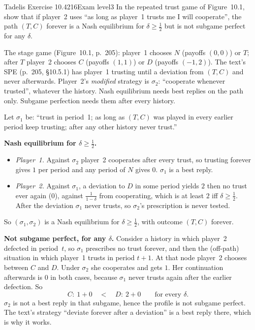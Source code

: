 \begin{exsol}{Tadelis Exercise 10.4}{216}{Exam level}{3}
\asked In the repeated trust game of Figure~10.1, show that if player~2 uses ``as long as player~1 trusts me I
will cooperate'', the path $(T, C)$ forever is a Nash equilibrium for $\delta \ge \frac12$ but is not
subgame perfect for any $\delta$.

\method The stage game (Figure~10.1, p.~205): player~1 chooses $N$ (payoffs $(0,0)$) or $T$; after $T$ player~2
chooses $C$ (payoffs $(1,1)$) or $D$ (payoffs $(-1,2)$). The text's SPE (p.~205, \S10.5.1) has player~1 trusting
until a deviation from $(T,C)$ and never afterwards. Player~2's \emph{modified} strategy is $\sigma_2$: ``cooperate
whenever trusted'', whatever the history. Nash equilibrium needs best replies on the path only. Subgame
perfection needs them after every history.

\solution
Let $\sigma_1$ be: ``trust in period~1; as long as $(T,C)$ was played in every earlier period keep trusting;
after any other history never trust.''

\textbf{Nash equilibrium for $\delta \ge \frac12$.}
\begin{itemize}
  \item \emph{Player~1.} Against $\sigma_2$ player~2 cooperates after every trust, so trusting forever gives $1$ per
  period and any period of $N$ gives $0$. $\sigma_1$ is a best reply.
  \item \emph{Player~2.} Against $\sigma_1$, a deviation to $D$ in some period yields $2$ then no trust ever again
  ($0$), against $\frac{1}{1-\delta}$ from cooperating, which is at least $2$ iff $\delta \ge \frac12$. After the
  deviation $\sigma_1$ never trusts, so $\sigma_2$'s prescription is never tested.
\end{itemize}
So $(\sigma_1, \sigma_2)$ is a Nash equilibrium for $\delta \ge \frac12$, with outcome $(T,C)$ forever.

\textbf{Not subgame perfect, for any $\delta$.} Consider a history in which player~2 defected in period~$t$, so
$\sigma_1$ prescribes no trust forever, and then the (off-path) situation in which player~1 trusts in period $t+1$.
At that node player~2 chooses between $C$ and $D$. Under $\sigma_2$ she cooperates and gets $1$. Her continuation
afterwards is $0$ in both cases, because $\sigma_1$ never trusts again after the earlier defection. So
\[
  C:\ 1 + 0 \quad<\quad D:\ 2 + 0 \qquad \text{for every } \delta .
\]
$\sigma_2$ is not a best reply in that subgame, hence the profile is not subgame perfect. The text's strategy
``deviate forever after a deviation'' is a best reply there, which is why it works.


\end{exsol}
